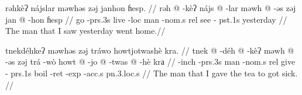 \pex
\a
\begingl
\glpreamble rəhkèʔ nájslar məwhəs zəj janhon ɦesp. //
\gla rəh @ -kèʔ nájs @ -lar məwh @ -əs zəj jan @ -hon ɦesp //
\glb go -{\sc prs}.3s live -{\sc loc} man -{\sc nom}.s {\sc rel} see -{\sc
pst}.1s yesterday //
\glft The man that I saw yesterday went home.//
\endgl

\a
\begingl
\glpreamble tnekdéhkeʔ məwhəs zəj tráwo howtjotwashè kra. //
\gla tnek @ -déh @ -kèʔ məwh @ -əs zəj trá -wò howt @ -jo @ -twas @ -hè krа //
\glb {[be ill]} -{\sc inch} -{\sc prs}.3s man -{\sc nom}.s {\sc rel} give -{\sc
prs}.1s boil -{\sc ret} -{\sc exp} -{\sc acc}.s {\sc pn}.3.{\sc loc}.s //
\glft The man that I gave the tea to got sick. //
\endgl
\xe

